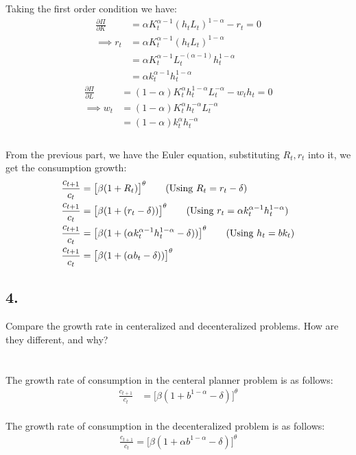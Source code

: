 \documentclass[12pt]{extarticle}
\def\secondarycolor{Golden}
\newcommand{\problem}[1]{
    \subsection*{\textcolor{\secondarycolor}{#1}}
    \addcontentsline{toc}{subsection}{\protect\numberline{}#1}
}
\newcommand{\rond}[2]{\frac{\partial #1}{\partial #2}}
\begin{document}
Taking the first order condition we have:
\begin{align*}
    \rond{\Pi}{K}&= \alpha K_t^{\alpha-1} (h_tL_t)^{1-\alpha} - r_t = 0\\
    \implies r_t &= \alpha K_t^{\alpha-1} (h_tL_t)^{1-\alpha}\\
    &= \alpha K_t^{\alpha-1} L_t^{-(\alpha-1)} h_t^{1-\alpha}\\
    &= \alpha k_t^{\alpha-1} h_t^{1-\alpha}
\end{align*}
\begin{align*}
    \rond{\Pi}{L} &= (1-\alpha) K_t^{\alpha}h_t^{1-\alpha}L_t^{-\alpha} - w_t h_t = 0\\
    \implies  w_t &= (1-\alpha)K_t^{\alpha}h_t^{-\alpha}L_t^{-\alpha}\\
    &= (1-\alpha)k_t^{\alpha}h_t^{-\alpha}\\
\end{align*}\\
From the previous part, we have the Euler equation, substituting $R_t,r_t$ into it, we get the consumption growth:\\
\begin{align*}
    \frac{c_{t+1}}{c_t} &= \bigl[\beta (1 + R_t)\bigr]^{\theta} \tag{Using $R_t = r_t - \delta$}\\
    \frac{c_{t+1}}{c_t} &= \bigl[\beta (1 + (r_t - \delta))\bigr]^{\theta} \tag{Using $r_t = \alpha k_t^{\alpha-1} h_t^{1-\alpha}$}\\
    \frac{c_{t+1}}{c_t} &= \bigl[\beta (1 + (\alpha k_t^{\alpha-1} h_t^{1-\alpha} - \delta))\bigr]^{\theta} \tag{Using $h_t = b k_t$}\\
    \frac{c_{t+1}}{c_t} &= \bigl[\beta (1 + (\alpha b_t - \delta))\bigr]^{\theta}\\
\end{align*}

\newpage
\problem{4.}Compare the growth rate in centeralized and decenteralized problems. How are they different, and why?\\\\\\
The growth rate of consumption in the centeral planner problem is as follows:
\begin{align*}
    \frac{c_{t+1}}{c_t} &= \bigl[\beta(1 + b^{1-\alpha} - \delta)\bigr]^{\theta} 
\end{align*}\\
The growth rate of consumption in the decenteralized problem is as follows:
\begin{align*}
    \frac{c_{t+1}}{c_t} = \bigl[\beta (1 + \alpha b^{1-\alpha} - \delta)\bigr]^{\theta} 
\end{align*}\\
\end{document}
